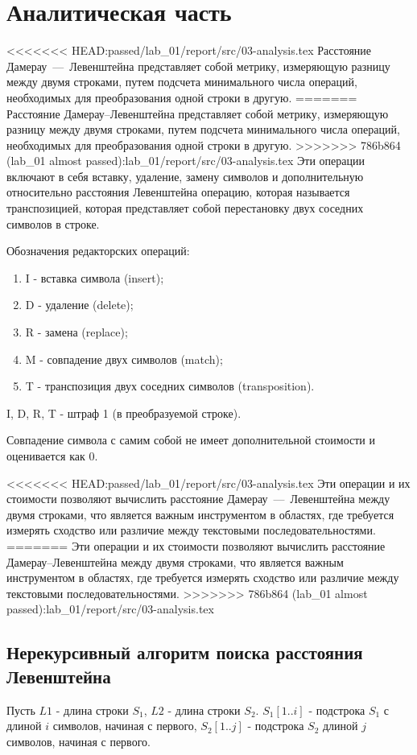 \section{Аналитическая часть}

<<<<<<< HEAD:passed/lab_01/report/src/03-analysis.tex
Расстояние Дамерау~---~Левенштейна представляет собой метрику, измеряющую разницу между двумя строками, путем подсчета минимального числа операций, необходимых для преобразования одной строки в другую.
=======
Расстояние Дамерау--Левенштейна представляет собой метрику, измеряющую разницу между двумя строками, путем подсчета минимального числа операций, необходимых для преобразования одной строки в другую.
>>>>>>> 786b864 (lab_01 almost passed):lab_01/report/src/03-analysis.tex
Эти операции включают в себя вставку, удаление, замену символов и дополнительную относительно расстояния Левенштейна операцию, которая называется транспозицией, которая представляет собой перестановку двух соседних символов в строке. \cite{cyberleninka_modifitsirovannyi_algoritm}

Обозначения редакторских операций:
\begin{enumerate}
	\item I - вставка символа (insert);
	\item D - удаление (delete);
	\item R - замена (replace);
	\item M - совпадение двух символов (match);
	\item T - транспозиция двух соседних символов (transposition).
\end{enumerate}
I, D, R, T - штраф 1 (в преобразуемой строке).

Совпадение символа с самим собой не имеет дополнительной стоимости и оценивается как 0.

<<<<<<< HEAD:passed/lab_01/report/src/03-analysis.tex
Эти операции и их стоимости позволяют вычислить расстояние Дамерау~---~Левенштейна между двумя строками, что является важным инструментом в областях, где требуется измерять сходство или различие между текстовыми последовательностями.
=======
Эти операции и их стоимости позволяют вычислить расстояние Дамерау--Левенштейна между двумя строками, что является важным инструментом в областях, где требуется измерять сходство или различие между текстовыми последовательностями.
>>>>>>> 786b864 (lab_01 almost passed):lab_01/report/src/03-analysis.tex

\subsection{Нерекурсивный алгоритм поиска расстояния Левенштейна}
Пусть $L1$ - длина строки $S_{1}$, $L2$ - длина строки $S_{2}$. 
$S_{1}[1..i]$ - подстрока $S_{1}$ с длиной $i$ символов, начиная с первого, $S_{2}[1..j]$ - подстрока $S_{2}$ длиной $j$ символов, начиная с первого. \cite{levenstein_book}

